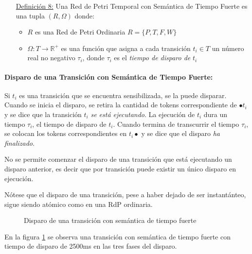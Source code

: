 \begin{itemize}
  \item [\underline{Definición 8:}] Una Red de Petri Temporal con Semántica de
  Tiempo Fuerte es una tupla $(R, \Omega)$ donde:
  \begin{itemize}
    \item $R$ es una Red de Petri Ordinaria $R = \{P, T, F, W \}$
    \item $\Omega: T \rightarrow \mathbb{R^{+}}$ es una función que asigna
    a cada transición $t_{i} \in T$ un número real no negativo $\tau_{i}$,
    donde $\tau_{i}$ es el \textit{tiempo de disparo de} $t_{i}$
  \end{itemize}
\end{itemize}

\paragraph{Disparo de una Transición con Semántica de Tiempo Fuerte:}

Si $t_{i}$ es una transición que se encuentra sensibilizada, se la puede
disparar. Cuando se inicia el disparo, se retira la cantidad de tokens
correspondiente de $\bullet t_{i}$ y se dice que la transición $t_{i}$
\textit{se está ejecutando}.
La ejecución de $t_{i}$ dura un tiempo $\tau_{i}$, el tiempo de disparo de
$t_{i}$.
Cuando termina de transcurrir el tiempo $\tau_{i}$, se colocan los tokens
correspondientes en $t_{i} \bullet$ y se dice que el disparo \textit{ha
finalizado}.

No se permite comenzar el disparo de una transición que está ejecutando un
disparo anterior, es decir que por transición puede existir un único disparo en
ejecución.

Nótese que el disparo de una transición, pese a haber dejado de ser
instantánteo, sigue siendo atómico como en una RdP ordinaria.

\begin{figure}[h]
  \centering
  \caption{Disparo de una transición con semántica de tiempo fuerte}
  \label{fig:disparo_tiempo_fuerte}
\end{figure}

En la figura \ref{fig:disparo_tiempo_fuerte} se observa una transición con
semántica de tiempo fuerte con tiempo de disparo de 2500ms en las tres fases del
disparo.

